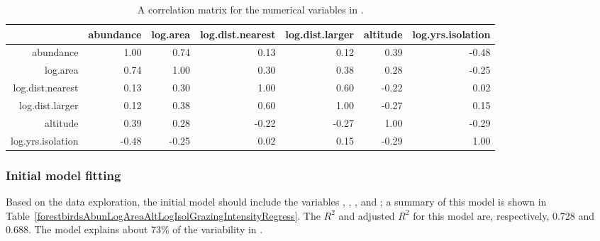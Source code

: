\begin{table}[ht]
	\footnotesize
	\centering
	\begin{tabular}{rrrrrrr}
		\hline
		& abundance & log.area & log.dist.nearest & log.dist.larger & altitude & log.yrs.isolation \\ 
		\hline
		abundance & 1.00 & 0.74 & 0.13 & 0.12 & 0.39 & -0.48 \\ 
		log.area & 0.74 & 1.00 & 0.30 & 0.38 & 0.28 & -0.25 \\ 
		log.dist.nearest & 0.13 & 0.30 & 1.00 & 0.60 & -0.22 & 0.02 \\ 
		log.dist.larger & 0.12 & 0.38 & 0.60 & 1.00 & -0.27 & 0.15 \\ 
		altitude & 0.39 & 0.28 & -0.22 & -0.27 & 1.00 & -0.29 \\ 
		log.yrs.isolation & -0.48 & -0.25 & 0.02 & 0.15 & -0.29 & 1.00 \\ 
		\hline
	\end{tabular}
\caption{A correlation matrix for the numerical variables in .}
\label{forestbirdsCorrelation}
\end{table}


\subsubsection{Initial model fitting}

Based on the data exploration, the initial model should include the variables , , , and ; a summary of this model is shown in Table~\ref{forestbirdsAbunLogAreaAltLogIsolGrazingIntensityRegress}. The $R^2$ and adjusted $R^2$ for this model are, respectively, 0.728 and 0.688.  The model explains about 73\% of the variability in .  

